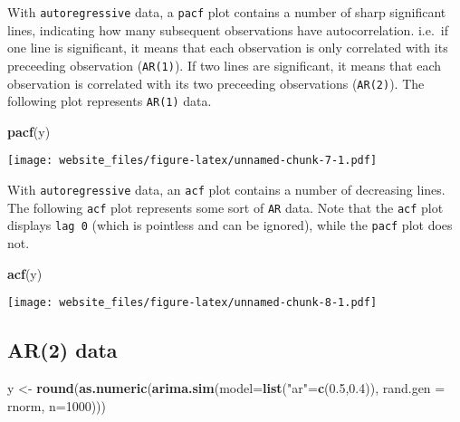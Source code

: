 \documentclass[]{book}
\newenvironment{Shaded}{\begin{snugshade}}{\end{snugshade}}
\newcommand{\KeywordTok}[1]{\textcolor[rgb]{0.13,0.29,0.53}{\textbf{#1}}}
\newcommand{\DataTypeTok}[1]{\textcolor[rgb]{0.13,0.29,0.53}{#1}}
\newcommand{\DecValTok}[1]{\textcolor[rgb]{0.00,0.00,0.81}{#1}}
\newcommand{\FloatTok}[1]{\textcolor[rgb]{0.00,0.00,0.81}{#1}}
\newcommand{\StringTok}[1]{\textcolor[rgb]{0.31,0.60,0.02}{#1}}
\newcommand{\NormalTok}[1]{#1}
\begin{document}
With \texttt{autoregressive} data, a \texttt{pacf} plot contains a
number of sharp significant lines, indicating how many subsequent
observations have autocorrelation. i.e.~if one line is significant, it
means that each observation is only correlated with its preceeding
observation (\texttt{AR(1)}). If two lines are significant, it means
that each observation is correlated with its two preceeding observations
(\texttt{AR(2)}). The following plot represents \texttt{AR(1)} data.

\begin{Shaded}
\begin{Highlighting}[]
\KeywordTok{pacf}\NormalTok{(y)}
\end{Highlighting}
\end{Shaded}

\texttt{[image: website\_files/figure-latex/unnamed-chunk-7-1.pdf]}

\newpage

With \texttt{autoregressive} data, an \texttt{acf} plot contains a
number of decreasing lines. The following \texttt{acf} plot represents
some sort of \texttt{AR} data. Note that the \texttt{acf} plot displays
\texttt{lag\ 0} (which is pointless and can be ignored), while the
\texttt{pacf} plot does not.

\begin{Shaded}
\begin{Highlighting}[]
\KeywordTok{acf}\NormalTok{(y)}
\end{Highlighting}
\end{Shaded}

\texttt{[image: website\_files/figure-latex/unnamed-chunk-8-1.pdf]}

\newpage 

\subsection{AR(2) data}\label{ar2-data}

\begin{Shaded}
\begin{Highlighting}[]
\NormalTok{y <-}\StringTok{ }\KeywordTok{round}\NormalTok{(}\KeywordTok{as.numeric}\NormalTok{(}\KeywordTok{arima.sim}\NormalTok{(}\DataTypeTok{model=}\KeywordTok{list}\NormalTok{(}\StringTok{"ar"}\NormalTok{=}\KeywordTok{c}\NormalTok{(}\FloatTok{0.5}\NormalTok{,}\FloatTok{0.4}\NormalTok{)), }\DataTypeTok{rand.gen =}\NormalTok{ rnorm, }\DataTypeTok{n=}\DecValTok{1000}\NormalTok{)))}
\end{Highlighting}
\end{Shaded}
\end{document}
